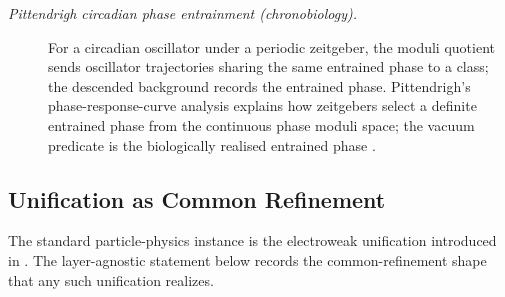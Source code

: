 \documentclass[11pt]{article}
\theoremstyle{definition}
\begin{document}
\begin{description}
\item[\emph{Pittendrigh circadian phase entrainment
(chronobiology).}]
For a circadian oscillator under a periodic
zeitgeber, the moduli quotient sends oscillator
trajectories sharing the same entrained phase to a
class; the descended background records the
entrained phase.  Pittendrigh's phase-response-curve
analysis explains how zeitgebers select a definite
entrained phase from the continuous phase moduli
space; the vacuum predicate is the biologically
realised entrained phase
\citep{Pittendrigh1960Circadian}.
\end{description}

\subsection{Unification as Common Refinement}\label{sec:self-reference-limits:unification}

The standard particle-physics instance is the electroweak unification
introduced in \citet{Weinberg1967Leptons}.  The layer-agnostic
statement below records the common-refinement shape that any such
unification realizes.
\end{document}
